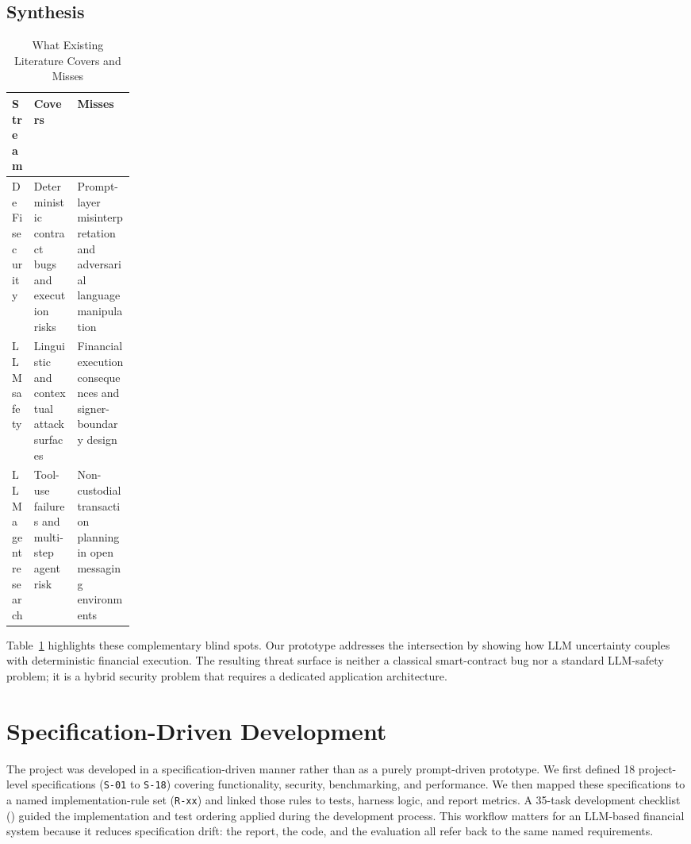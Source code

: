 ﻿\documentclass[conference]{IEEEtran}
\begin{document}
\subsection{Synthesis}

\begin{table}[!htbp]
\centering
\caption{What Existing Literature Covers and Misses}
\label{tab:literature-summary}
\small
\begin{tabularx}{\linewidth}{>{\raggedright\arraybackslash}p{0.18\linewidth} >{\raggedright\arraybackslash}X >{\raggedright\arraybackslash}X}
\toprule
\textbf{Stream} & \textbf{Covers} & \textbf{Misses} \\
\midrule
DeFi security  & Deterministic contract bugs and execution risks & Prompt-layer misinterpretation and adversarial language manipulation \\
LLM safety     & Linguistic and contextual attack surfaces & Financial execution consequences and signer-boundary design \\
LLM agent research & Tool-use failures and multi-step agent risk & Non-custodial transaction planning in open messaging environments \\
\bottomrule
\end{tabularx}
\end{table}

Table~\ref{tab:literature-summary} highlights these complementary blind spots.
Our prototype addresses the intersection by showing how LLM
uncertainty couples with deterministic financial execution. The resulting
threat surface is neither a classical smart-contract bug nor a standard
LLM-safety problem; it is a hybrid security problem that requires a dedicated
application architecture.

\section{Specification-Driven Development}

The project was developed in a specification-driven manner rather than as a
purely prompt-driven prototype. We first defined 18 project-level
specifications (\texttt{S-01} to \texttt{S-18}) covering functionality,
security, benchmarking, and performance. We then mapped these specifications to
a named implementation-rule set (\texttt{R-xx}) and linked those rules to
tests, harness logic, and report metrics. A 35-task development checklist
() guided the implementation and
test ordering applied during the development process. This workflow matters for
an LLM-based financial system because it reduces specification drift: the
report, the code, and the evaluation all refer back to the same named
requirements.
\end{document}
